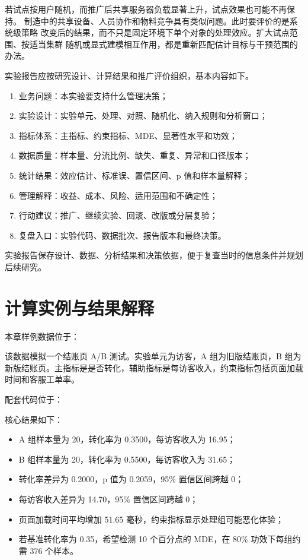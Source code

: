 若试点按用户随机，而推广后共享服务器负载显著上升，试点效果也可能不再保持。
制造中的共享设备、人员协作和物料竞争具有类似问题。此时要评价的是系统级策略
改变后的结果，而不只是固定环境下单个对象的处理效应。扩大试点范围、按适当集群
随机或显式建模相互作用，都是重新匹配估计目标与干预范围的办法。

实验报告应按研究设计、计算结果和推广评价组织，基本内容如下。
\begin{enumerate}
  \item 业务问题：本实验要支持什么管理决策；
  \item 实验设计：实验单元、处理、对照、随机化、纳入规则和分析窗口；
  \item 指标体系：主指标、约束指标、MDE、显著性水平和功效；
  \item 数据质量：样本量、分流比例、缺失、重复、异常和口径版本；
  \item 统计结果：效应估计、标准误、置信区间、p 值和样本量解释；
  \item 管理解释：收益、成本、风险、适用范围和不确定性；
  \item 行动建议：推广、继续实验、回滚、改版或分层复验；
  \item 复盘入口：实验代码、数据批次、报告版本和最终决策。
\end{enumerate}

实验报告保存设计、数据、分析结果和决策依据，便于复查当时的信息条件并规划后续研究。

\section{计算实例与结果解释}

本章样例数据位于：
\begin{center}
\end{center}
该数据模拟一个结账页 A/B 测试。实验单元为访客，A 组为旧版结账页，B 组为新版结账页。主指标是是否转化，辅助指标是每访客收入，约束指标包括页面加载时间和客服工单率。

配套代码位于：
\begin{center}
\end{center}

核心结果如下：
\begin{itemize}
  \item A 组样本量为 20，转化率为 0.3500，每访客收入为 16.95；
  \item B 组样本量为 20，转化率为 0.5500，每访客收入为 31.65；
  \item 转化率差异为 0.2000，p 值为 0.2059，95\% 置信区间跨越 0；
  \item 每访客收入差异为 14.70，95\% 置信区间跨越 0；
  \item 页面加载时间平均增加 51.65 毫秒，约束指标显示处理组可能恶化体验；
  \item 若基准转化率为 0.35，希望检测 10 个百分点的 MDE，在 80\% 功效下每组约需 376 个样本。
\end{itemize}

